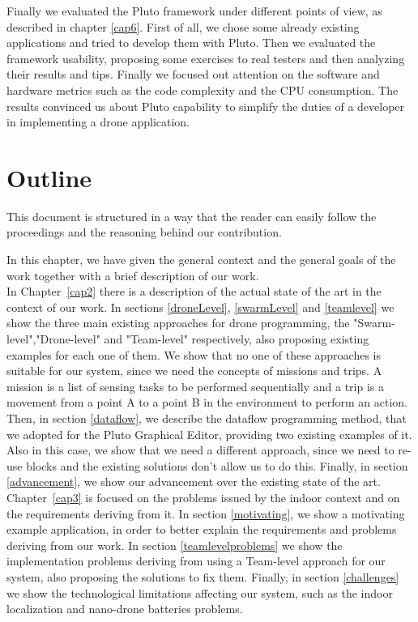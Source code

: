 Finally we evaluated the Pluto framework under different points of view, as described in chapter \ref{cap6}. 
First of all, we chose some already existing applications and tried to develop them with Pluto.
Then we evaluated the framework usability, proposing some exercises to real testers and then analyzing their results and tips.
Finally we focused out attention on the software and hardware metrics such as the code complexity and the CPU consumption. 
The results convinced us about Pluto capability to simplify the duties of a developer in implementing a drone application.
\\

\section{Outline}

This document is structured in a way that the reader can easily follow the proceedings and the reasoning behind our contribution.

In this chapter, we have given the general context and the general goals of the work together with a brief description of our work.
\\

In Chapter~\ref{cap2} there is a description of the actual state of the art in the context of our work.
In sections \ref{droneLevel}, \ref{swarmLevel} and \ref{teamlevel} we show the three main existing approaches for drone programming, the "Swarm-level","Drone-level" and "Team-level" respectively, also proposing existing examples for each one of them.
We show that no one of these approaches is suitable for our system, since we need the concepts of missions and trips.
A mission is a list of sensing tasks to be performed sequentially and a trip is a movement from a point A to a point B in the environment to perform an action.
Then, in section \ref{dataflow}, we describe the dataflow programming method, that we adopted for the Pluto Graphical Editor, providing two existing examples of it.
Also in this case, we show that we need a different approach, since we need to re-use blocks and the existing solutions don't allow us to do this.
Finally, in section \ref{advancement}, we show our advancement over the existing state of the art.
\\

Chapter~\ref{cap3} is focused on the problems issued by the indoor context and on the requirements deriving from it.
In section \ref{motivating}, we show a motivating example application, in order to better explain the requirements and problems deriving from our work.
In section \ref{teamlevelproblems} we show the implementation problems deriving from using a Team-level approach for our system, also proposing the solutions to fix them.
Finally, in section \ref{challenges} we show the technological limitations affecting our system, such as the indoor localization and nano-drone batteries problems.
\\

